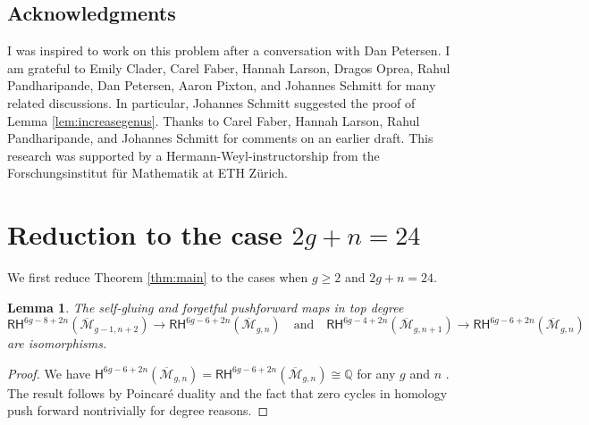 \documentclass[12pt]{amsart}
\newtheorem{lem}[thm]{Lemma}
\theoremstyle{definition}
\renewcommand{\H}{\mathsf{H}}
\newcommand{\qq}{\mathbb{Q}}
\newcommand{\RH}{\mathsf{RH}}
\newcommand{\M}{\mathcal{M}}
\newcommand{\Mb}{\overline{\M}}
\begin{document}
 

\subsection*{Acknowledgments}
I was inspired to work on this problem after a conversation with Dan Petersen. I am grateful to Emily Clader, Carel Faber, Hannah Larson, Dragos Oprea, Rahul Pandharipande, Dan Petersen, Aaron Pixton, and Johannes Schmitt for many related discussions. In particular, Johannes Schmitt suggested the proof of Lemma \ref{lem:increasegenus}. Thanks to Carel Faber, Hannah Larson, Rahul Pandharipande, and Johannes Schmitt for comments on an earlier draft.  This research was supported by a Hermann-Weyl-instructorship from the Forschungsinstitut für Mathematik at ETH Z\"urich.

\section{Reduction to the case $2g+n=24$}\label{sec:reduction}
We first reduce Theorem \ref{thm:main} to the cases when $g\geq 2$ and $2g+n=24$. %

\begin{lem}\label{socles}
The self-gluing and forgetful pushforward maps in top degree
\[
\RH^{6g-8+2n}(\Mb_{g-1,n+2})\rightarrow \RH^{6g-6+2n}(\Mb_{g,n}) \quad \text{and} \quad \RH^{6g-4+2n}(\Mb_{g,n+1})\rightarrow \RH^{6g-6+2n}(\Mb_{g,n})
\]
are isomorphisms.
\end{lem}
\begin{proof}
We have $\H^{6g-6+2n}(\Mb_{g,n})=\RH^{6g-6+2n}(\Mb_{g,n})\cong \qq$ for any $g$ and $n$ \cite{GraberVakil}. The result follows by Poincar\'e duality and the fact that zero cycles in homology push forward nontrivially for degree reasons.
\end{proof}
\end{document}
